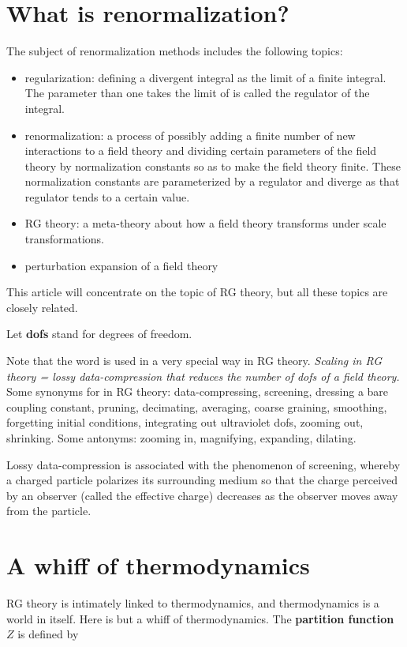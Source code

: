 \section{What is renormalization?}

The subject of renormalization
methods includes the following topics:
\begin{itemize}
\item regularization:
defining a divergent integral as the
limit of a finite integral.
The parameter than one takes
the limit of is called the
regulator of the integral.
\item renormalization:
a process of possibly
adding a finite number
of new interactions to a field theory
and dividing certain parameters
of the field theory
by normalization constants
so as to make the
field theory finite. These
normalization constants
are parameterized by a
regulator and diverge as
that regulator tends to a
certain value.
\item RG theory: a meta-theory
about how a field theory transforms
under scale transformations.
\item perturbation expansion of a field
theory
\end{itemize}
This article will concentrate
on the topic of RG theory,
but all these topics are closely
related.

Let {\bf dofs} stand for
degrees of freedom.

Note that the word
 is used in a very
special way
in RG theory.
\emph{Scaling in RG theory =
lossy data-compression
that
reduces the number of dofs of a field theory.}
Some synonyms for 
in RG theory:
data-compressing,
screening,
dressing a bare coupling constant,
pruning,
decimating,
averaging,
coarse graining,
smoothing,
forgetting initial conditions,
integrating out ultraviolet dofs,
zooming out,
shrinking. Some antonyms:
zooming in,
magnifying,
expanding,
dilating.

Lossy data-compression
is associated with
 the phenomenon of screening,
whereby a charged particle polarizes
its surrounding medium so that
the charge perceived by
an observer (called
the effective charge)
decreases as
the observer moves
away from the particle.


\section{A whiff of thermodynamics}
RG theory is intimately linked to
thermodynamics,
and thermodynamics is a world in itself.
Here is but a whiff of thermodynamics.
The \textbf{partition function} $Z$ is defined by

